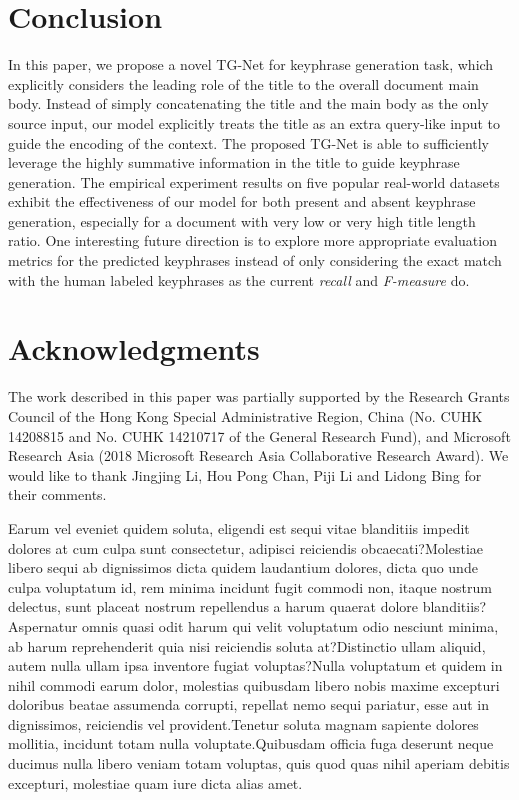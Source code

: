 \documentclass[letterpaper]{article} %
\begin{document}
\section{Conclusion} \label{section: conclusion}
In this paper, we propose a novel TG-Net for keyphrase generation task, which explicitly considers the leading role of the title to the overall document main body. Instead of simply concatenating the title and the main body as the only source input, our model explicitly treats the title as an extra query-like input to guide the encoding of the context. The proposed TG-Net is able to sufficiently leverage the highly summative information in the title to guide keyphrase generation. The empirical experiment results on five popular real-world datasets exhibit the effectiveness of our model for both present and absent keyphrase generation, especially for a document with very low or very high title length ratio. One interesting future direction is to explore more appropriate evaluation metrics for the predicted keyphrases instead of only considering the exact match with the human labeled keyphrases as the current \textit{recall} and \textit{F-measure} do.

\vspace{-0.92mm}
\vspace{-1.59mm}
\section{Acknowledgments}
The work described in this paper was partially supported
by the Research Grants Council of the Hong
Kong Special Administrative Region, China (No. CUHK
14208815 and No. CUHK 14210717 of the General Research
Fund), and Microsoft Research Asia (2018 Microsoft
Research Asia Collaborative Research Award). We would like to thank Jingjing Li, Hou Pong Chan, Piji Li and Lidong Bing for their comments.

\fontsize{9.0pt}{10.0pt} \selectfont  Earum vel eveniet quidem soluta, eligendi est sequi vitae blanditiis impedit dolores at cum culpa sunt consectetur, adipisci reiciendis obcaecati?Molestiae libero sequi ab dignissimos dicta quidem laudantium dolores, dicta quo unde culpa voluptatum id, rem minima incidunt fugit commodi non, itaque nostrum delectus, sunt placeat nostrum repellendus a harum quaerat dolore blanditiis?Aspernatur omnis quasi odit harum qui velit voluptatum odio nesciunt minima, ab harum reprehenderit quia nisi reiciendis soluta at?Distinctio ullam aliquid, autem nulla ullam ipsa inventore fugiat voluptas?Nulla voluptatum et quidem in nihil commodi earum dolor, molestias quibusdam libero nobis maxime excepturi doloribus beatae assumenda corrupti, repellat nemo sequi pariatur, esse aut in dignissimos, reiciendis vel provident.Tenetur soluta magnam sapiente dolores mollitia, incidunt totam nulla voluptate.Quibusdam officia fuga deserunt neque ducimus nulla libero veniam totam voluptas, quis quod quas nihil aperiam debitis excepturi, molestiae quam iure dicta alias amet.\clearpage


\end{document}
